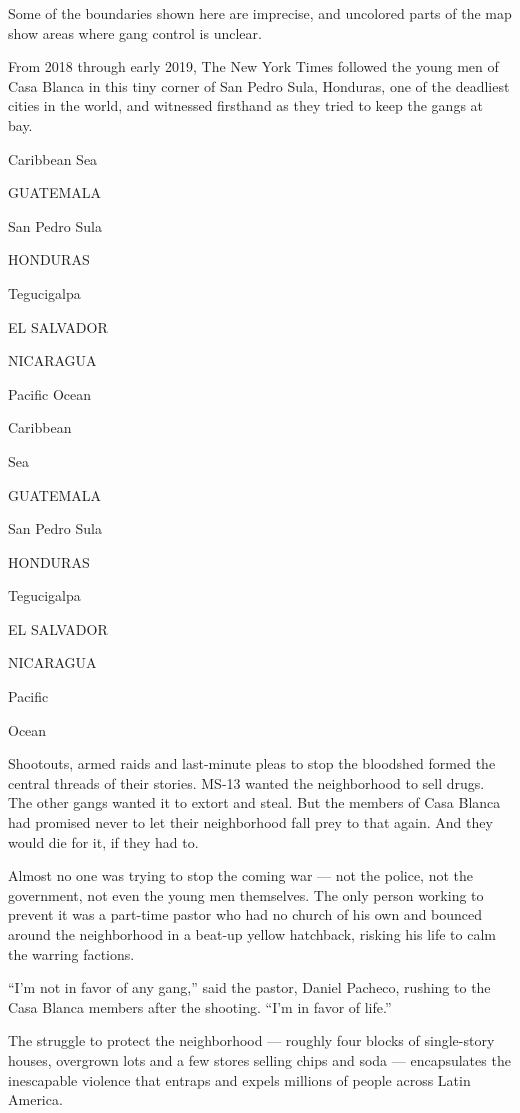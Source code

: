 Some of the boundaries shown here are imprecise, and uncolored parts of
the map show areas where gang control is unclear.

From 2018 through early 2019, The New York Times followed the young men
of Casa Blanca in this tiny corner of San Pedro Sula, Honduras, one of
the deadliest cities in the world, and witnessed firsthand as they tried
to keep the gangs at bay.

Caribbean Sea

GUATEMALA

San Pedro Sula

HONDURAS

Tegucigalpa

EL SALVADOR

NICARAGUA

Pacific Ocean

Caribbean

Sea

GUATEMALA

San Pedro Sula

HONDURAS

Tegucigalpa

EL SALVADOR

NICARAGUA

Pacific

Ocean

Shootouts, armed raids and last-minute pleas to stop the bloodshed
formed the central threads of their stories. MS-13 wanted the
neighborhood to sell drugs. The other gangs wanted it to extort and
steal. But the members of Casa Blanca had promised never to let their
neighborhood fall prey to that again. And they would die for it, if they
had to.

Almost no one was trying to stop the coming war --- not the police, not
the government, not even the young men themselves. The only person
working to prevent it was a part-time pastor who had no church of his
own and bounced around the neighborhood in a beat-up yellow hatchback,
risking his life to calm the warring factions.

``I'm not in favor of any gang,'' said the pastor, Daniel Pacheco,
rushing to the Casa Blanca members after the shooting. ``I'm in favor of
life.''

The struggle to protect the neighborhood --- roughly four blocks of
single-story houses, overgrown lots and a few stores selling chips and
soda --- encapsulates the inescapable violence that entraps and expels
millions of people across Latin America.


